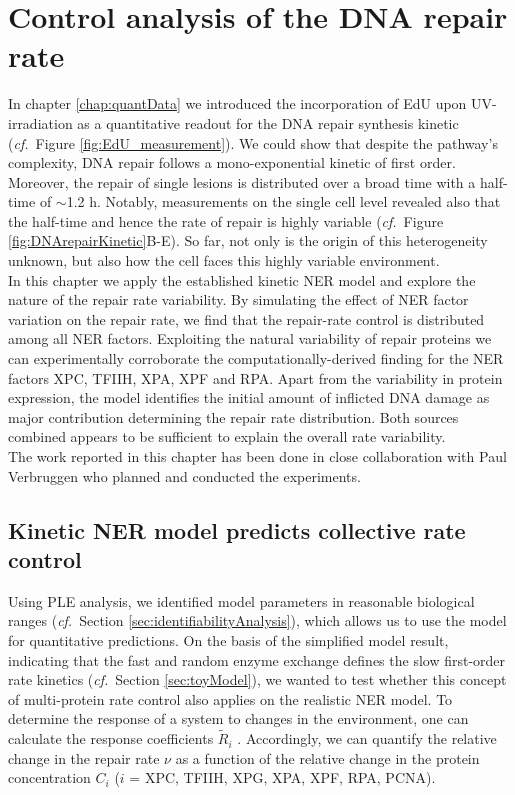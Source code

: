 \chapter{Control analysis of the DNA repair rate}
\label{chap:robustRepair}

In chapter \ref{chap:quantData} we introduced the incorporation of EdU upon UV-irradiation as a quantitative readout for the DNA repair synthesis kinetic (\textit{cf.}\ Figure \ref{fig:EdU_measurement}). We could show that despite the pathway's complexity, DNA repair follows a mono-exponential kinetic of first order. Moreover, the repair of single lesions is distributed over a broad time with a half-time of $\sim$1.2 h. Notably, measurements on the single cell level revealed also that the half-time and hence the rate of repair is highly variable (\textit{cf.}\ Figure \ref{fig:DNArepairKinetic}B-E). So far, not only is the origin of this heterogeneity unknown, but also how the cell faces this highly variable environment.\\  
In this chapter we apply the established kinetic NER model and explore the nature of the repair rate variability. By simulating the effect of NER factor variation on the repair rate, we find that the repair-rate control is distributed among all NER factors. Exploiting the natural variability of repair proteins we can experimentally corroborate the computationally-derived finding for the NER factors XPC, TFIIH, XPA, XPF and RPA. Apart from the variability in protein expression, the model identifies the initial amount of inflicted DNA damage as major contribution determining the repair rate distribution. Both sources combined appears to be sufficient to explain the overall rate variability.\\     

The work reported in this chapter has been done in close collaboration with Paul Verbruggen who planned and conducted the experiments.

\section{Kinetic NER model predicts collective rate control}
\label{sec:repairControl}
Using PLE analysis, we identified model parameters in reasonable biological ranges (\textit{cf.}\ Section \ref{sec:identifiabilityAnalysis}), which allows us to use the model for quantitative predictions. On the basis of the simplified model result, indicating that the fast and random enzyme exchange defines the slow first-order rate kinetics (\textit{cf.}\ Section \ref{sec:toyModel}), we wanted to test whether this concept of multi-protein rate control also applies on the realistic NER model. To determine the response of a system to changes in the environment, one can calculate the response coefficients $\tilde{R}_i$ \label{sec:reponseC} \cite{Hofmeyr1991,Fell1992}. Accordingly, we can quantify the relative change in the repair rate $\nu$ as a function of the relative change in the protein concentration $C_i$ ($i$ = XPC, TFIIH, XPG, XPA, XPF, RPA, PCNA).

